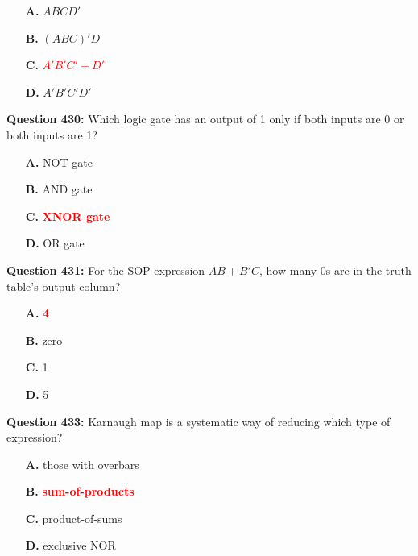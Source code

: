 \documentclass[12pt,a4paper]{article}
\begin{document}
\begin{itemize}
    \item[\textbf{A.}] $ABCD'$
    \item[\textbf{B.}] $(ABC)'D$
    \item[\textbf{C.}] \textcolor{red}{\textbf{$A'B'C' + D'$}}
    \item[\textbf{D.}] $A'B'C'D'$
\end{itemize}

\vspace{0.5cm}

\vspace{0.5cm}

\textbf{Question 430:} Which logic gate has an output of 1 only if both inputs are 0 or both inputs are 1?

\begin{itemize}
    \item[\textbf{A.}] NOT gate
    \item[\textbf{B.}] AND gate
    \item[\textbf{C.}] \textcolor{red}{\textbf{XNOR gate}}
    \item[\textbf{D.}] OR gate
\end{itemize}

\vspace{0.5cm}

\vspace{0.5cm}

\textbf{Question 431:} \underline{\hspace{1.5cm}}For the SOP expression $AB + B'C$, how many 0s are in the truth table's output column?

\begin{itemize}
    \item[\textbf{A.}] \textcolor{red}{\textbf{4}}
    \item[\textbf{B.}] zero
    \item[\textbf{C.}] 1
    \item[\textbf{D.}] 5
\end{itemize}

\vspace{0.5cm}

\vspace{0.5cm}

\textbf{Question 433:} \underline{\hspace{1.5cm}}Karnaugh map is a systematic way of reducing which type of expression?

\begin{itemize}
    \item[\textbf{A.}] those with overbars
    \item[\textbf{B.}] \textcolor{red}{\textbf{sum-of-products}}
    \item[\textbf{C.}] product-of-sums
    \item[\textbf{D.}] exclusive NOR
\end{itemize}
\end{document}
